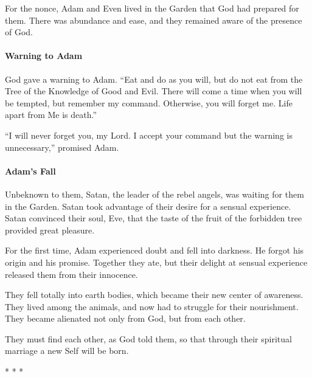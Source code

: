 For the nonce, Adam and Even lived in the Garden that God had prepared for them. There was abundance and ease, and they remained aware of the presence of God.

\paragraph{Warning to Adam}


God gave a warning to Adam. ``Eat and do as you will, but do not eat from the Tree of the Knowledge of Good and Evil. There will come a time when you will be tempted, but remember my command. Otherwise, you will forget me. Life apart from Me is death.''

``I will never forget you, my Lord. I accept your command but the warning is unnecessary,'' promised Adam.

\paragraph{Adam's Fall}


Unbeknown to them, Satan, the leader of the rebel angels, was waiting for them in the Garden. Satan took advantage of their desire for a sensual experience. Satan convinced their soul, Eve, that the taste of the fruit of the forbidden tree provided great pleasure.

For the first time, Adam experienced doubt and fell into darkness. He forgot his origin and his promise. Together they ate, but their delight at sensual experience released them from their innocence.

They fell totally into earth bodies, which became their new center of awareness. They lived among the animals, and now had to struggle for their nourishment. They became alienated not only from God, but from each other.

They must find each other, as God told them, so that through their spiritual marriage a new Self will be born.



\begin{center}* * *\end{center}

